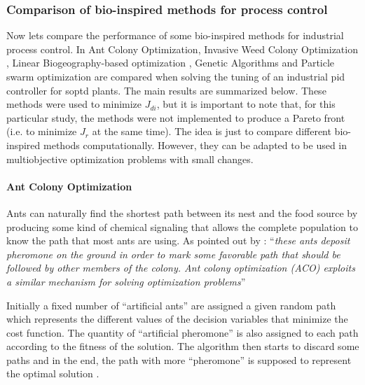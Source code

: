 \subsubsection{Comparison of bio-inspired methods for process control}
%
Now lets compare the performance of some bio-inspired methods for industrial process control. In \citet{Cespedes2016} Ant Colony Optimization, Invasive Weed Colony Optimization \citep{Mehrabian2006}, Linear Biogeography-based optimization \citep{Simon2008}, Genetic Algorithms and Particle swarm optimization are compared when solving the tuning of an industrial \gls{pid} controller for \gls{soptd} plants. The main results are summarized below. These methods were used to minimize $J_{di}$, but it is important to note that, for this particular study, the methods were not implemented to produce a Pareto front (i.e. to minimize $J_r$ at the same time). The idea is just to compare different bio-inspired methods computationally. However, they can be adapted to be used in multiobjective optimization problems with small changes.

\paragraph{Ant Colony Optimization}
\label{sec:ACO}
Ants can naturally find the shortest path between its nest and the food source by producing some kind of chemical signaling that allows the complete population to know the path that most ants are using.  As pointed out by \citet{Dorigo2006}: ``\textit{these  ants  deposit pheromone  on  the  ground  in  order  to  mark  some  favorable path that should be followed by other members of the colony. Ant colony optimization (ACO) exploits a similar mechanism for solving optimization problems}''

Initially a fixed number of ``artificial ants'' are assigned a given random path which represents the different values of the decision variables that minimize the cost function. The quantity of ``artificial pheromone'' is also assigned to each path according to the fitness of the solution. The algorithm then starts to discard some paths and in the end, the path with more ``pheromone'' is supposed to represent the optimal solution \citep{Goss1989}.
%
